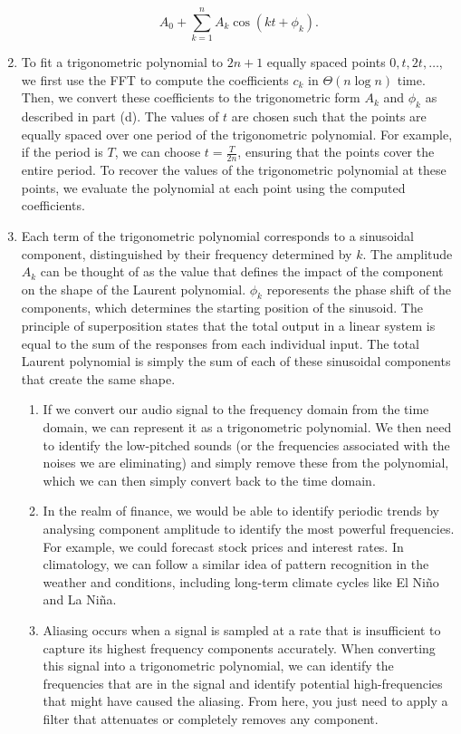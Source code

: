 \documentclass{article}
\begin{document}
\begin{solution}
\begin{enumerate}[label = (\alph*)]
$$A_0 + \sum_{k = 1}^n A_k\cos(kt + \phi_k).$$

    \item To fit a trigonometric polynomial to $2n+1$ equally spaced points $0, t, 2t, \ldots$, we first use the FFT to compute the coefficients $c_k$ in $\Theta(n \log n)$ time. Then, we convert these coefficients to the trigonometric form $A_k$ and $\phi_k$ as described in part (d). The values of $t$ are chosen such that the points are equally spaced over one period of the trigonometric polynomial. For example, if the period is $T$, we can choose $t = \frac{T}{2n}$, ensuring that the points cover the entire period. To recover the values of the trigonometric polynomial at these points, we evaluate the polynomial at each point using the computed coefficients.

  \item Each term of the trigonometric polynomial corresponds to a sinusoidal component, distinguished by their frequency determined by $k$. The amplitude $A_k$ can be thought of as the value that defines the impact of the component on the shape of the Laurent polynomial. $\phi_k$ reporesents the phase shift of the components, which determines the starting position of the sinusoid. The principle of superposition states that the total output in a linear system is equal to the sum of the responses from each individual input. The total Laurent polynomial is simply the sum of each of these sinusoidal components that create the same shape.

    \begin{enumerate}[label = (\roman*)]
        \item If we convert our audio signal to the frequency domain from the time domain, we can represent it as a trigonometric polynomial. We then need to identify the low-pitched sounds (or the frequencies associated with the noises we are eliminating) and simply remove these from the polynomial, which we can then simply convert back to the time domain.

        \item In the realm of finance, we would be able to identify periodic trends by analysing component amplitude to identify the most powerful frequencies. For example, we could forecast stock prices and interest rates. In climatology, we can follow a similar idea of pattern recognition in the weather and conditions, including long-term climate cycles like El Niño and La Niña.

        \item Aliasing occurs when a signal is sampled at a rate that is insufficient to capture its highest frequency components accurately. When converting this signal into a trigonometric polynomial, we can identify the frequencies that are in the signal and identify potential high-frequencies that might have caused the aliasing. From here, you just need to apply a filter that attenuates or completely removes any component.


\end{enumerate}
\end{enumerate}
\end{solution}
\end{document}
